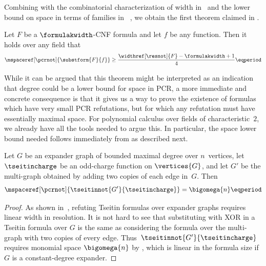 Combining 
with the combinatorial characterization of width in~%
and the lower bound on space in terms of \kextendibleNok families in~%
,
we obtain the first theorem claimed in 
.


%
%
%
%
\begin{theorem}
%
  Let $F$ be a $\formulakwidth$-CNF formula and let $f$ be any
  \nonauthor{} function. Then
  it holds over any field that %
  \begin{equation*}
    \mspaceref[\pcrnot]{\substform{F}{f}} 
    \geq 
    \frac{\widthref[\resnot]{F} - \formulakwidth + 1}{4} \eqperiod
  \end{equation*}
%
\end{theorem}

While it can be argued that this theorem might be interpreted as an
indication that degree could be a lower bound for space in PCR, a more
immediate and concrete consequence is that 
it gives us a way to prove the existence of formulas which have very
small PCR refutations, but for which any refutation must
have essentially maximal space. 
%
For polynomial calculus over fields of characteristic~$2$, we already
have all the tools needed to argue this. In particular, 
the space lower bound needed
follows immediately from
as described next.

\begin{corollary}\label{cor:tseitin-double}
  Let $G$ be
%
%
  an expander graph of bounded maximal %
  degree over $n$~vertices,
  let
  $\tseitincharge$ be an odd-charge function on 
  $\vertices{G}$,
  and let $G'$ be 
  the multi-graph obtained by adding two copies of each edge in~$G$.
%
  Then
  \begin{equation*}
    \mspaceref[\pcrnot]{\tseitinnot{G'}{\tseitincharge}} =
    \bigomega{n}
    \eqperiod
  \end{equation*}
\end{corollary}
\begin{proof}
  As shown in~\cite{BW01ShortProofs},
  refuting Tseitin formulas over expander graphs requires linear width
  in resolution. It is not hard to see that substituting with XOR in a
  Tseitin formula over $G$ is the same as considering 
  the formula over the multi-graph with two copies of every edge.
  Thus~$\tseitinnot{G'}{\tseitincharge}$ requires monomial space
  $\bigomega{n}$ 
  by
 ,
  which is linear in the formula size if $G$ is a constant-degree expander.
\end{proof}

